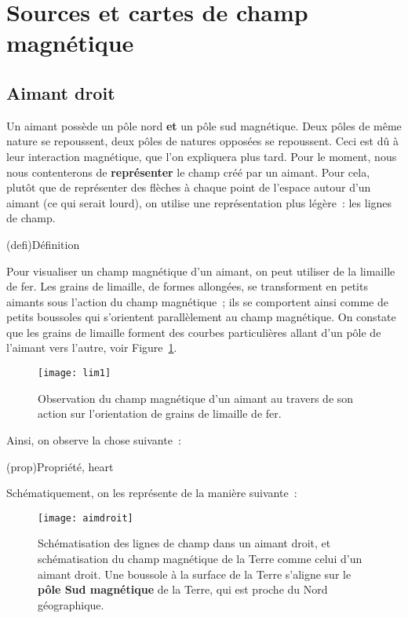 \documentclass[../../main/main.tex]{subfiles}
\begin{document}
\section{Sources et cartes de champ magnétique}
\subsection{Aimant droit}
\label{ssec:aimdroit}
Un aimant possède un pôle nord \textbf{et} un pôle sud magnétique. Deux pôles de
même nature se repoussent, deux pôles de natures opposées se repoussent. Ceci
est dû à leur interaction magnétique, que l'on expliquera plus tard. Pour le
moment, nous nous contenterons de \textbf{représenter} le champ créé par un
aimant. Pour cela, plutôt que de représenter des flèches à chaque point de
l'espace autour d'un aimant (ce qui serait lourd), on utilise une représentation
plus légère~: les lignes de champ.
\begin{tcb}(defi){Définition}
\end{tcb}

Pour visualiser un champ magnétique d'un aimant, on peut utiliser de la limaille
de fer. Les grains de limaille, de formes allongées, se transforment en petits
aimants sous l'action du champ magnétique~; ils se comportent ainsi comme de
petits boussoles qui s'orientent parallèlement au champ magnétique. On constate
que les grains de limaille forment des courbes particulières allant d'un pôle de
l'aimant vers l'autre, voir Figure~\ref{fig:lim1}.
\begin{figure}[h]
	\centering
	\texttt{[image: lim1]}
	\caption{Observation du champ magnétique d'un aimant au travers de son action
		sur l'orientation de grains de limaille de fer.}
	\label{fig:lim1}
\end{figure}
Ainsi, on observe la chose suivante~:
\begin{tcb}(prop){Propriété, heart}
\end{tcb}
Schématiquement, on les représente de la manière suivante~:

\begin{figure}[h]
	\centering
	\texttt{[image: aimdroit]}
	\caption{Schématisation des lignes de champ dans un aimant droit, et
		schématisation du champ magnétique de la Terre comme celui d'un aimant droit.
		Une boussole à la surface de la Terre s'aligne sur le \textbf{pôle Sud magnétique}
		de la Terre, qui est proche du Nord géographique.}
	\label{fig:aimdroitterre}
\end{figure}
\end{document}
